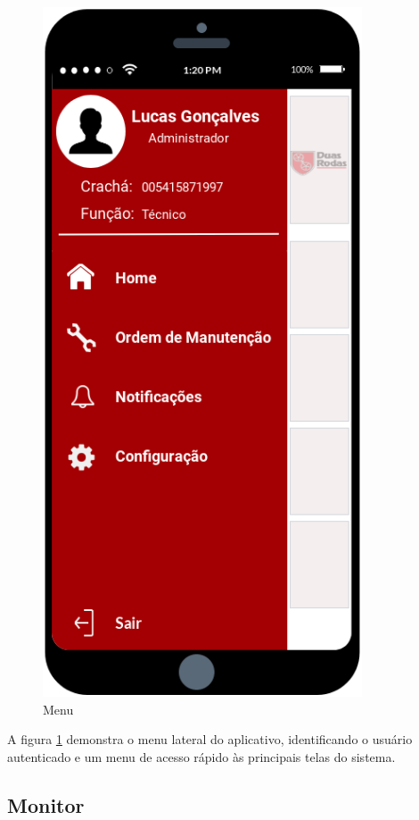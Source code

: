 {\begin{figure}[htb]
	\caption{\label{mobile_menu}Menu}
	\begin{center}
		\includegraphics[scale=0.80]{./Figuras/mobile/menu.png}
	\end{center}
\end{figure}

A figura \ref{mobile_menu} demonstra o menu lateral do aplicativo, identificando o usuário autenticado e um menu de acesso rápido às principais telas do sistema.

\newpage
\subsection{Monitor}

}
